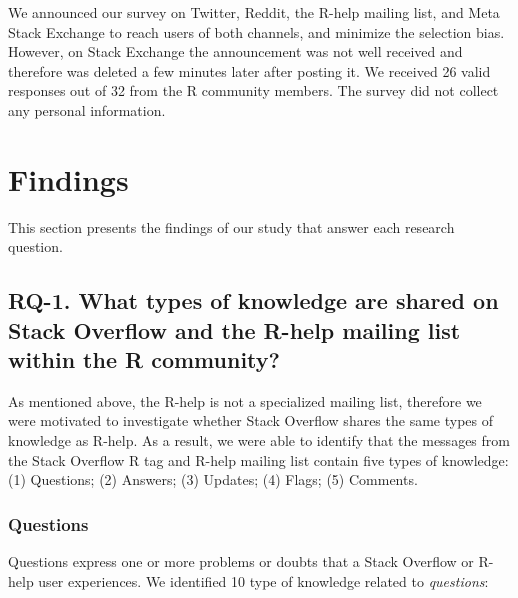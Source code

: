 \documentclass{sig-alternate-05-2015}
\begin{document}
We announced our survey on Twitter, Reddit, the R-help mailing list, and Meta Stack Exchange to reach users of both channels, and minimize the selection bias.
However, on Stack Exchange the announcement was not well received and therefore was deleted a few minutes later after posting it.
We received 26 valid responses out of 32 from the R community members.
The survey did not collect any personal information.


\section{Findings}
\label{cha:findings}

This section presents the findings of our study that answer each research question.

\subsection{RQ-1. What types of knowledge are shared on Stack Overflow and the R-help mailing list within the R community?}
\label{cha:findings-types}

	As mentioned above, the R-help is not a specialized mailing list, therefore we were motivated to investigate whether Stack Overflow shares the same types of knowledge as R-help.
	As a result, we were able to identify that the messages from the Stack Overflow R tag and R-help mailing list contain five types of knowledge:
	(1) Questions;
	(2) Answers;
	(3) Updates;
	(4) Flags;
	(5) Comments.

\subsubsection{Questions}

Questions express one or more problems or doubts that a Stack Overflow or R-help user experiences.
We identified 10 type of knowledge related to \emph{questions}:
\end{document}
